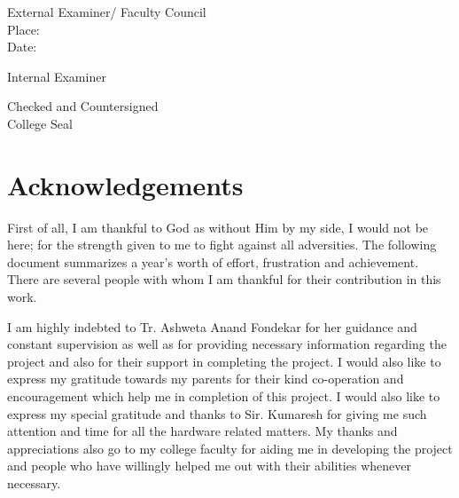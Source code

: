 \documentclass[12pt]{article}
\begin{document}
\endgroup
\vspace{4cm}
\begin{flushleft}
External Examiner/ Faculty Council\\
Place:\\
Date:\\
\end{flushleft}


\begin{flushright}\vspace{-2cm} Internal Examiner\end{flushright}

\vspace{5cm}
\begin{flushleft}
Checked and Countersigned\\
College Seal
\end{flushleft}



\clearpage
\newpage
\section{Acknowledgements}
First of all, I am thankful to God as without Him by my side, I would not be here;
for the strength given to me to fight against all adversities. The following document
summarizes a year’s worth of effort, frustration and achievement. There are several
people with whom I am thankful for their contribution in this work.

I am highly indebted to Tr. Ashweta Anand Fondekar for her guidance and constant supervision as well as for providing necessary information regarding the project and also for their support in completing the project. I would also like to express my gratitude towards my parents for their kind co-operation and encouragement which help me in completion of this project. I would also like to express my special gratitude and thanks to Sir. Kumaresh for giving me such attention and time for all the hardware related matters. My thanks and appreciations also go to my college faculty for aiding me in developing the project and people who have willingly helped me out with their abilities whenever necessary.


\newpage
\tableofcontents
\newpage
\listoffigures
\newpage
\listoftables
\newpage
\end{document}
